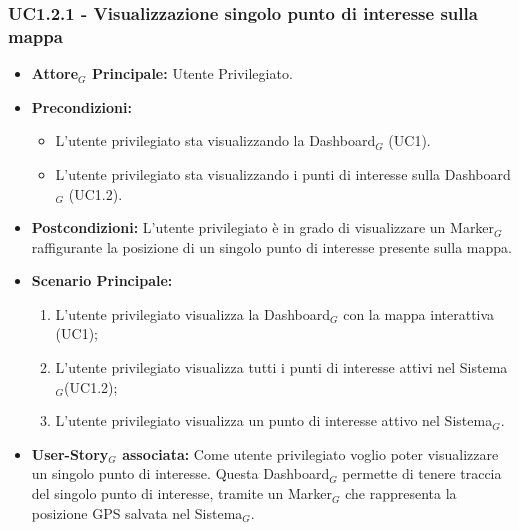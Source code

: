 \documentclass[10pt]{article}
\begin{document}
\begin{justify}
\subsubsection{\textbf{UC1.2.1 - Visualizzazione singolo punto di interesse sulla mappa}}
\label{UC1.2.1}
\begin{itemize}
     \item \textbf{Attore$_G$ Principale:} Utente Privilegiato.
     \item \textbf{Precondizioni:}
        \begin{itemize}
    		\item L'utente privilegiato sta visualizzando la Dashboard$_G$ (UC1).
    		\item L'utente privilegiato sta visualizzando i punti di interesse sulla Dashboard$_G$ (UC1.2).
        \end{itemize}
     \item \textbf{Postcondizioni:} L'utente privilegiato è in grado di visualizzare un Marker$_G$ raffigurante la posizione di un singolo punto di interesse presente sulla mappa.
     \item \textbf{Scenario Principale:}
        \begin{enumerate}
            \item L'utente privilegiato visualizza la Dashboard$_G$ con la mappa interattiva (UC1);
            \item L'utente privilegiato visualizza tutti i punti di interesse attivi nel Sistema$_G$(UC1.2);
            \item L'utente privilegiato visualizza un punto di interesse attivo nel Sistema$_G$.
        \end{enumerate}
     \item \textbf{User-Story$_G$ associata:}
     Come utente privilegiato voglio poter visualizzare un singolo punto di interesse. Questa Dashboard$_G$ permette di tenere traccia del singolo punto di interesse, tramite un Marker$_G$ che rappresenta la posizione GPS salvata nel Sistema$_G$.
\end{itemize}

\end{justify}
\end{document}
